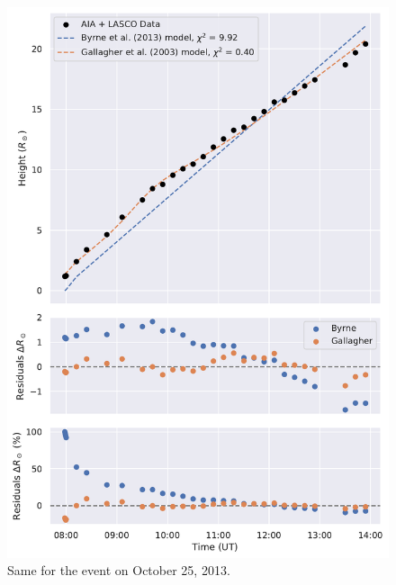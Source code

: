 \begin{figure}[!htp]
	\centering
	\includegraphics[width=0.8\hsize]{chapter2/figs/appendix/height_profile_residuals_aia_lasco_131025_01.pdf}
	\caption{Same for the event on October 25, 2013.}
\end{figure}

